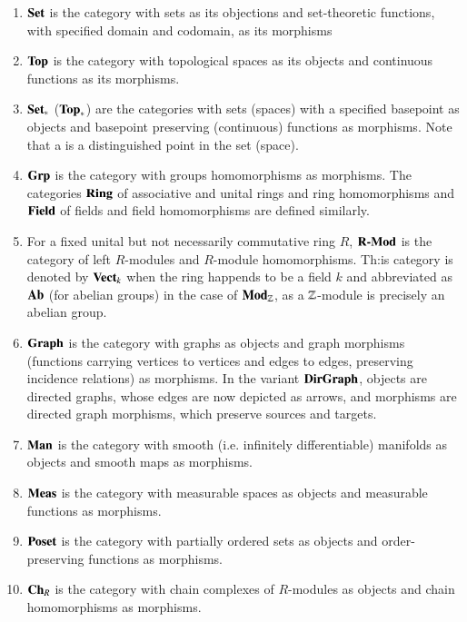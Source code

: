 \documentclass[12pt]{report}
\begin{document}
\begin{eg}{}{}
    \leavevmode
    \begin{enumerate}
        \item $\normalfont\textbf{Set}$ is the category with sets as its objections and set-theoretic functions, with specified domain and codomain, as its morphisms
        \item $\normalfont\textbf{Top}$ is the category with topological spaces as its objects and continuous functions as its morphisms.
        \item $\normalfont\textbf{Set}_*$ ($\normalfont\textbf{Top}_*$) are the categories with sets (spaces) with a specified basepoint as objects and basepoint preserving (continuous) functions as morphisms. Note that a  is a distinguished point in the set (space).
        \item $\normalfont\textbf{Grp}$ is the category with groups homomorphisms as morphisms. The categories $\normalfont\textbf{Ring}$ of associative and unital rings and ring homomorphisms and $\normalfont\textbf{Field}$ of fields and field homomorphisms are defined similarly.
        \item For a fixed unital but not necessarily commutative ring $R$, $\normalfont\textbf{R-Mod}$ is the category of left $R$-modules and $R$-module homomorphisms. Th:is category is denoted by $\normalfont\textbf{Vect}_{k}$ when the ring happends to be a field $k$ and abbreviated as $\normalfont\textbf{Ab}$ (for abelian groups) in the case of $\normalfont\textbf{Mod}_{\mathbb Z}$, as a $\mathbb Z$-module is precisely an abelian group.
        \item $\normalfont\textbf{Graph}$ is the category with graphs as objects and graph morphisms (functions carrying vertices to vertices and edges to edges, preserving incidence relations) as morphisms. In the variant $\normalfont\textbf{DirGraph}$, objects are directed graphs, whose edges are now depicted as arrows, and morphisms are directed graph morphisms, which preserve sources and targets.
        \item $\normalfont\textbf{Man}$ is the category with smooth (i.e. infinitely differentiable) manifolds as objects and smooth maps as morphisms.
        \item $\normalfont\textbf{Meas}$ is the category with measurable spaces as objects and measurable functions as morphisms. 
        \item $\normalfont\textbf{Poset}$ is the category with partially ordered sets as objects and order-preserving functions as morphisms.
        \item $\normalfont\textbf{Ch}_R$ is the category with chain complexes of $R$-modules as objects and chain homomorphisms as morphisms.
            \begin{defn}{}{}

\end{defn}
\end{enumerate}
\end{eg}
\end{document}
